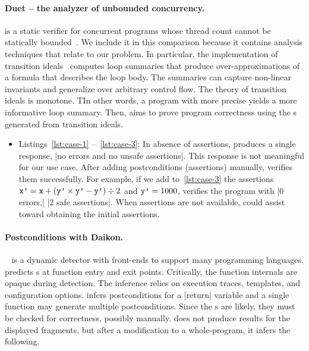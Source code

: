 \paragraph{Duet -- the analyzer of unbounded concurrency.}
 is a static verifier for concurrent programs whose thread count cannot be statically bounded~\cite{duet}.
We include it in this comparison because it contains analysis techniques that relate to our problem.
In particular, the implementation of {transition ideals}~\cite{cyphert2024}
computes {loop summaries} that produce over-approximations of a formula that describes the loop body.
The summaries can capture non-linear invariants and generalize over arbitrary control flow.
The theory of transition ideals is monotone.
TIn other words, a program with more precise  yields a more informative loop summary.
Then,  aims to prove program correctness using the s generated from transition ideals.

\begin{itemize}
\item Listings~\ref{lst:case-1} --~\ref{lst:case-3}:
    In absence of assertions,  produces a single response, \pr|no errors and no unsafe assertions|.
    This response is not meaningful for our use case.
    After adding postconditions (assertions) manually,  verifies them successfully.
    For example, if we add to~\autoref{lst:case-3} the assertions
    \(\prm{x'}=\prm{x}+(\prm{y'}\times\prm{y'}-\prm{y'}) \div 2 \) and \(\prm{y'}=1000 \),
     verifies the program with \pr|0 errors,| \pr|2 safe assertions|.
    When assertions are not available, \ndx{\impl} could assist  toward obtaining the initial assertions.
\end{itemize}

\paragraph{Postconditions with Daikon.}
~\cite{ernst2007,daikon} is a dynamic  detector with front-ends to support many programming languages.
 predicts s at function entry and exit points.
Critically, the function internals are opaque during  detection.
The inference relies on execution traces, templates, and configuration options.
 infers postconditions for a \pr|return| variable
and a single function may generate multiple postconditions.
Since the s are likely, they must be checked for correctness, possibly manually.
 does not produce results for the displayed fragments, but after a modification to a whole-program,
it infers the following.

